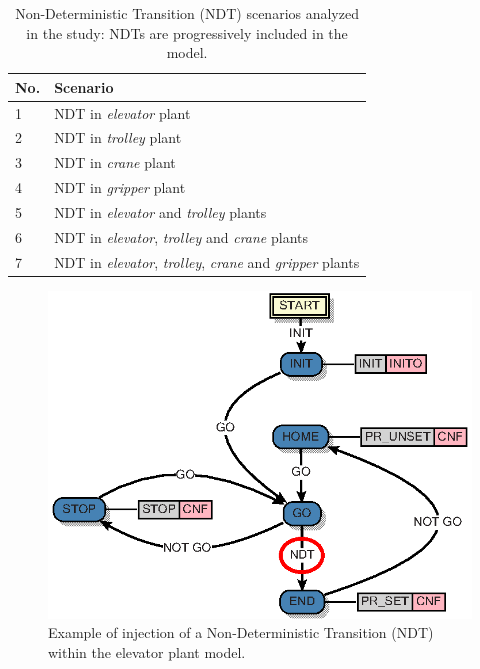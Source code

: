 \begin{bibunit}
\begin{table}[b!]
    \centering\small
    \renewcommand{\arraystretch}{1.5}
    \begin{tabularx}{\columnwidth}{ m{} m{} }
        \hline
        No. & Scenario                                                                                   \\ 
        \hline
        1   & NDT in \textit{elevator} plant                                                            \\ 
        2   & NDT in \textit{trolley} plant                                                             \\  
        3   & NDT in \textit{crane} plant                                                               \\ 
        4   & NDT in \textit{gripper} plant                                                             \\ 
        5   & NDT in \textit{elevator} and \textit{trolley} plants                                      \\ 
        6   & NDT in \textit{elevator}, \textit{trolley} and \textit{crane} plants                      \\ 
        7   & NDT in \textit{elevator}, \textit{trolley}, \textit{crane} and \textit{gripper} plants    \\
        \hline
    \end{tabularx}
    \caption{Non-Deterministic Transition (NDT) scenarios analyzed in the study: NDTs are progressively included in the model.}
    \label{table:2}
\end{table}

\begin{figure}[t!]
    \centering
    \includegraphics[width=0.95\columnwidth]{MX_Papers/Paper4/pictures/lilli10.eps}
    \caption{Example of injection of a Non-Deterministic Transition (NDT) within the elevator plant model.}
    \label{fig:ndt}
\end{figure}


\end{bibunit}
